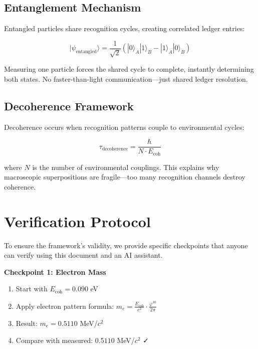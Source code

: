 \documentclass[12pt,a4paper]{article}
\newcommand{\Ecoh}{E_{\text{coh}}}
\newcommand{\golden}{\varphi}
\theoremstyle{definition}
\begin{document}
\subsection{Entanglement Mechanism}

Entangled particles share recognition cycles, creating correlated ledger entries:

\begin{equation}
    |\psi_{\text{entangled}}\rangle = \frac{1}{\sqrt{2}}(|0\rangle_A|1\rangle_B - |1\rangle_A|0\rangle_B)
\end{equation}

Measuring one particle forces the shared cycle to complete, instantly determining both states. No faster-than-light communication—just shared ledger resolution.

\subsection{Decoherence Framework}

Decoherence occurs when recognition patterns couple to environmental cycles:

\begin{equation}
    \tau_{\text{decoherence}} = \frac{\hbar}{N \cdot \Ecoh}
\end{equation}

where $N$ is the number of environmental couplings. This explains why macroscopic superpositions are fragile—too many recognition channels destroy coherence.

\section{Verification Protocol}

To ensure the framework's validity, we provide specific checkpoints that anyone can verify using this document and an AI assistant.

\begin{verifybox}
\textbf{Checkpoint 1: Electron Mass}
\begin{enumerate}
    \item Start with $\Ecoh = 0.090$ eV
    \item Apply electron pattern formula: $m_e = \frac{\Ecoh}{c^2} \cdot \frac{\golden^{10}}{2\pi}$
    \item Result: $m_e = 0.5110$ MeV/$c^2$
    \item Compare with measured: $0.5110$ MeV/$c^2$ ✓
\end{enumerate}
\end{verifybox}
\end{document}
